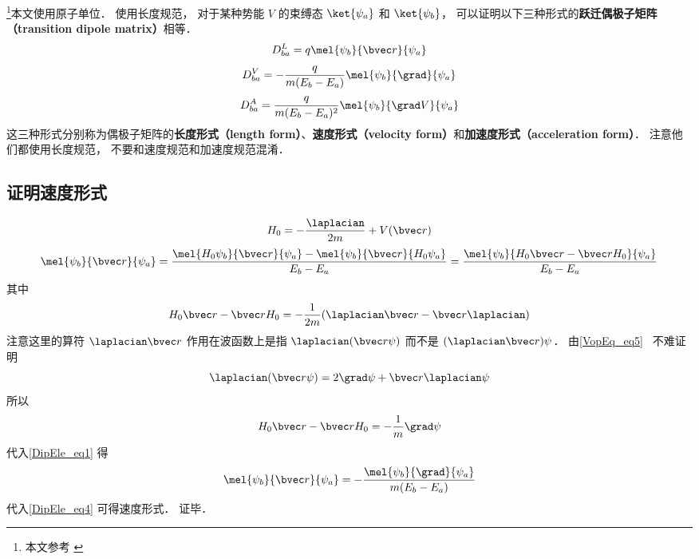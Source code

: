 

\footnote{本文参考 \cite{Brandsen}}本文使用原子单位． 使用长度规范， 对于某种势能 $V$ 的束缚态 $\ket{\psi_a}$ 和 $\ket{\psi_b}$， 可以证明以下三种形式的\textbf{跃迁偶极子矩阵（transition dipole matrix）}相等．
\begin{equation}\label{DipEle_eq4}
D_{ba}^L = q\mel{\psi_b}{\bvec r}{\psi_a}
\end{equation}
\begin{equation}\label{DipEle_eq3}
D_{ba}^V = -\frac{q}{m(E_b - E_a)}\mel{\psi_b}{\grad}{\psi_a}
\end{equation}
\begin{equation}
D_{ba}^A = \frac{q}{m(E_b-E_a)^2} \mel{\psi_b}{\grad V}{\psi_a}
\end{equation}
这三种形式分别称为偶极子矩阵的\textbf{长度形式（length form）}、\textbf{速度形式（velocity form）}和\textbf{加速度形式（acceleration form）}． 注意他们都使用长度规范， 不要和速度规范和加速度规范混淆． %

\subsection{证明速度形式}
\begin{equation}
H_0 = -\frac{\laplacian}{2m} + V(\bvec r)
\end{equation}
\begin{equation}\label{DipEle_eq1}
\mel{\psi_b}{\bvec r}{\psi_a} = \frac{\mel{H_0\psi_b}{\bvec r}{\psi_a} - \mel{\psi_b}{\bvec r}{H_0\psi_a}}{E_b - E_a} = \frac{\mel{\psi_b}{H_0\bvec r - \bvec rH_0}{\psi_a}}{E_b - E_a}
\end{equation}
其中
\begin{equation}
H_0\bvec r - \bvec rH_0 = -\frac{1}{2m}(\laplacian \bvec r - \bvec r \laplacian)
\end{equation}
注意这里的算符 $\laplacian \bvec r$ 作用在波函数上是指 $\laplacian (\bvec r \psi)$ 而不是 $(\laplacian \bvec r) \psi$． 由\autoref{VopEq_eq5}~ 不难证明
\begin{equation}
\laplacian (\bvec r \psi) = 2 \grad \psi + \bvec r \laplacian \psi
\end{equation}
所以
\begin{equation}
H_0\bvec r - \bvec rH_0 = -\frac{1}{m}\grad \psi
\end{equation}
代入\autoref{DipEle_eq1} 得
\begin{equation}
\mel{\psi_b}{\bvec r}{\psi_a} = -\frac{\mel{\psi_b}{\grad}{\psi_a}}{m(E_b - E_a)}
\end{equation}
代入\autoref{DipEle_eq4} 可得速度形式． 证毕．


